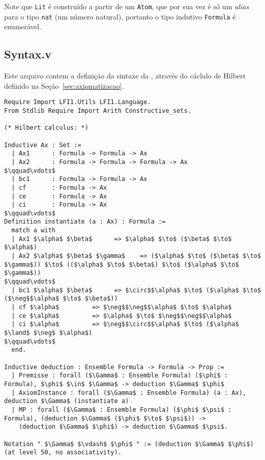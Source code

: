       Note que \texttt{Lit} é construído a partir de um \texttt{Atom}, que por sua vez é só um \textit{alias} para o tipo \texttt{nat} (um número natural), portanto o tipo indutivo \texttt{Formula} é enumerável.

    \subsection{Syntax.v}\label{sec:syntax}

      Este arquivo contem a definição da sintaxe da \lfium{}, através do cáclulo de Hilbert definido na Seção~\ref{sec:axiomatizacao}.

      \begin{lstlisting}[name=Syntax, frame=single, language=coq]
Require Import LFI1.Utils LFI1.Language.
From Stdlib Require Import Arith Constructive_sets.

(* Hilbert calculus: *)

Inductive Ax : Set :=
  | Ax1      : Formula -> Formula -> Ax
  | Ax2      : Formula -> Formula -> Formula -> Ax
$\qquad\vdots$
  | bc1      : Formula -> Formula -> Ax
  | cf       : Formula -> Ax
  | ce       : Formula -> Ax
  | ci       : Formula -> Ax
$\qquad\vdots$
Definition instantiate (a : Ax) : Formula :=
  match a with 
  | Ax1 $\alpha$ $\beta$      => $\alpha$ $\to$ ($\beta$ $\to$ $\alpha$)
  | Ax2 $\alpha$ $\beta$ $\gamma$    => ($\alpha$ $\to$ ($\beta$ $\to$ $\gamma$)) $\to$ (($\alpha$ $\to$ $\beta$) $\to$ ($\alpha$ $\to$ $\gamma$))
$\qquad\vdots$
  | bc1 $\alpha$ $\beta$      => $\circ$$\alpha$ $\to$ ($\alpha$ $\to$ ($\neg$$\alpha$ $\to$ $\beta$))
  | cf $\alpha$         => $\neg$$\neg$$\alpha$ $\to$ $\alpha$
  | ce $\alpha$         => $\alpha$ $\to$ $\neg$$\neg$$\alpha$
  | ci $\alpha$         => $\neg$$\circ$$\alpha$ $\to$ ($\alpha$ $\land$ $\neg$ $\alpha$)
$\qquad\vdots$
  end.
  
Inductive deduction : Ensemble Formula -> Formula -> Prop :=
  | Premisse : forall ($\Gamma$ : Ensemble Formula) ($\phi$ : Formula), $\phi$ $\in$ $\Gamma$ -> deduction $\Gamma$ $\phi$
  | AxiomInstance : forall ($\Gamma$ : Ensemble Formula) (a : Ax), deduction $\Gamma$ (instantiate a)
  | MP : forall ($\Gamma$ : Ensemble Formula) ($\phi$ $\psi$ : Formula), (deduction $\Gamma$ ($\phi$ $\to$ $\psi$)) -> 
    (deduction $\Gamma$ $\phi$) -> deduction $\Gamma$ $\psi$.

Notation " $\Gamma$ $\vdash$ $\phi$ " := (deduction $\Gamma$ $\phi$) (at level 50, no associativity).
      \end{lstlisting}

